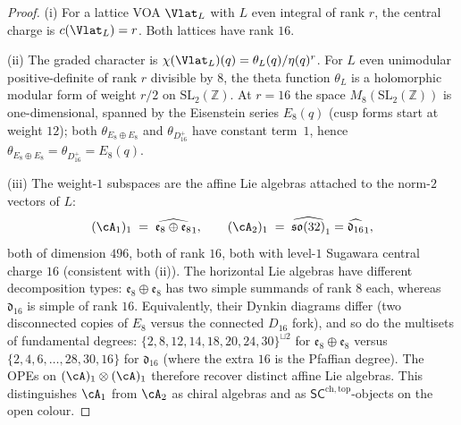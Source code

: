 \begin{proof}
\textup{(}i\textup{)} For a lattice VOA $\Vlat_L$ with $L$ even
integral of rank $r$, the central charge is $c(\Vlat_L) = r$. Both
lattices have rank $16$.

\textup{(}ii\textup{)} The graded character is
$\chi(\Vlat_L)(q) = \theta_L(q) / \eta(q)^r$. For $L$ even unimodular
positive-definite of rank $r$ divisible by $8$, the theta function
$\theta_L$ is a holomorphic modular form of weight $r/2$ on
$\mathrm{SL}_2(\mathbb Z)$. At $r = 16$ the space
$M_8(\mathrm{SL}_2(\mathbb Z))$ is one-dimensional, spanned by the
Eisenstein series $E_8(q)$ \textup{(}cusp forms start at weight
$12$\textup{)}; both $\theta_{E_8 \oplus E_8}$ and
$\theta_{D_{16}^+}$ have constant term~$1$, hence
$\theta_{E_8 \oplus E_8} = \theta_{D_{16}^+} = E_8(q)$.

\textup{(}iii\textup{)} The weight-$1$ subspaces are the affine
Lie algebras attached to the norm-$2$ vectors of $L$:
\[
(\cA_1)_1 \;=\; \widehat{\mathfrak e_8 \oplus \mathfrak e_8}_1,
\qquad
(\cA_2)_1 \;=\; \widehat{\mathfrak{so}(32)}_1
                                 = \widehat{\mathfrak d_{16}}_1,
\]
both of dimension $496$, both of rank $16$, both with level-$1$
Sugawara central charge $16$ \textup{(}consistent with
\textup{(}ii\textup{)}\textup{)}. The horizontal Lie algebras have
different decomposition types: $\mathfrak e_8 \oplus \mathfrak e_8$
has two simple summands of rank $8$ each, whereas $\mathfrak d_{16}$
is simple of rank $16$. Equivalently, their Dynkin diagrams differ
\textup{(}two disconnected copies of $E_8$ versus the connected
$D_{16}$ fork\textup{),} and so do the multisets of fundamental
degrees: $\{2,8,12,14,18,20,24,30\}^{\sqcup 2}$ for
$\mathfrak e_8 \oplus \mathfrak e_8$ versus
$\{2,4,6,\ldots,28,30,16\}$ for $\mathfrak d_{16}$ \textup{(}where
the extra $16$ is the Pfaffian degree\textup{).} The OPEs on
$(\cA)_1\otimes(\cA)_1$ therefore recover distinct affine Lie
algebras.  This distinguishes $\cA_1$ from $\cA_2$ as chiral algebras
and as $\mathsf{SC}^{\mathrm{ch,top}}$-objects on the open colour.
\end{proof}

